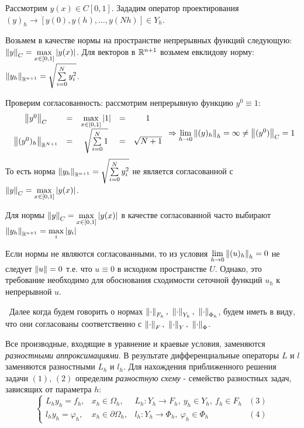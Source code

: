 \begin{example}
  Рассмотрим $y(x)\in C[0,1]$. Зададим оператор проектирования $(y)_h\rightarrow[y(0),y(h),\ldots,y(Nh)]\in Y_h$.

  Возьмем в качестве нормы на пространстве непрерывных функций следующую: $\left\lVert y\right\rVert_{C}=\max\limits_{x\in[0,1]}|y(x)|$.
  Для векторов в $\mathbb{R}^{n+1}$ возьмем евклидову норму: $\left\lVert y_h\right\rVert_{\mathbb{R}^{n+1}}=\sqrt{\sum\limits_{i=0}^{N}y_i^2}$.

  Проверим согласованность: рассмотрим непрерывную функцию $y^0\equiv1$:
  \[\begin{array}{ccccc}
      \left\lVert y^0\right\rVert_{C}            & = & \max\limits_{x\in[0,1]}\left\lvert1\right\rvert & = & 1          \\
      \left\lVert(y^0)_h\right\rVert_{\mathbb{R}^{N+1}} & = & \sqrt{\sum\limits_{i=0}^{N}1}  & = & \sqrt{N+1}
    \end{array}\Rightarrow \lim\limits_{h\rightarrow0}\left\lVert(y)_h\right\rVert_h=\infty\neq\left\lVert(y^0)\right\rVert_{C}=1\]
  То есть норма $\left\lVert y_h\right\rVert_{\mathbb{R}^{n+1}}=\sqrt{\sum\limits_{i=0}^{N}y_i^2}$ не является
  согласованной с $\left\lVert y\right\rVert_{C}=\max\limits_{x\in[0,1]}|y(x)|$.

  Для нормы $\left\lVert y\right\rVert_{C}=\max\limits_{x\in[0,1]}|y(x)|$ в качестве
  согласованной часто выбирают $\left\lVert y_h\right\rVert_{\mathbb{R}^{n+1}}=\max\limits_{i}|y_i|$
\end{example}

\begin{remark*}
  Если нормы не являются согласованными, то из условия
  $\lim\limits_{h\rightarrow0}\left\lVert(u)_h\right\rVert_h=0$ не следует $\left\lVert u\right\rVert=0$
  т.е. что $u\equiv0$ в исходном пространстве $U$.
  Однако, это требование необходимо для обоснования
  сходимости сеточной функций $u_h$ к непрерывной $u$.
\end{remark*}

\textbullet\ Далее когда будем говорить о нормах $\norm{\cdot}_{F_h},\ \norm{\cdot}_{Y_{h}},\ \norm{\cdot}_{\Phi_h}$, будем иметь
в виду, что они согласованы соответственно с $\norm{\cdot}_{F},\ \norm{\cdot}_{Y},\ \norm{\cdot}_{\Phi}$.

Все производные, входящие в уравнение и краевые условия, заменяются
\textit{разностными аппроксимациями}. В результате дифференциальные
операторы $L$ и $l$ заменяются разностными $L_h$ и $l_h$.
Для нахождения приближенного решения задачи $(1)$, $(2)$
определим \textit{разностную схему} - семейство разностных задач,
зависящих от параметра $h$:
\[\left\{\begin{array}{cccc}
    L_hy_h=f_h,       & x_h\in\Omega_h,          & L_h: Y_h\rightarrow F_h,\ y_h\in Y_h,\ f_h\in F_h & (3) \\
    l_hy_h=\varphi_h, & x_h\in \partial\Omega_h, & l_h: Y_h\rightarrow \Phi_h,\ \varphi_h\in\Phi_h   & (4)
  \end{array}\right.\]

